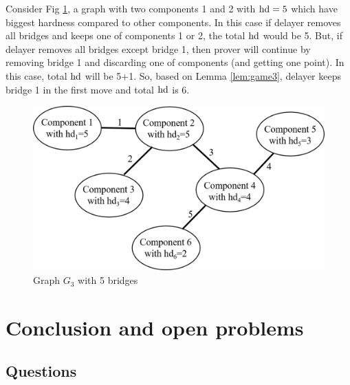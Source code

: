 \documentclass[12pt]{book}
\begin{document}
\begin{examp}\label{exp:hd6}
       Consider Fig \ref{fig:hd6}, a graph with two components 1 and 2 with $\operatorname{hd}=5$ which have biggest hardness compared
	   to other components. In this case if delayer removes all bridges and keeps one of components 1 or 2, the total $\operatorname{hd}$ 
	   would be 5. But, if delayer removes all bridges except bridge 1, then prover will continue by removing bridge 1 and discarding 
	   one of components (and getting one point). In this case, total $\operatorname{hd}$ will be 5+1. So, based on Lemma \ref{lem:game3}, 
	   delayer keeps bridge 1 in the first move and total $\operatorname{hd}$ is 6.
	  \begin{figure}
      \begin{center}
      \includegraphics[scale =0.65]{graph_with_bridges2.png}
      \caption{Graph $G_3$ with 5 bridges}
	  \label{fig:hd6}
      \end{center}
      \end{figure}
\end{examp}


\chapter{Conclusion and open problems}
\label{cha:concl}

\section{Questions}
\label{sec:Questions}
\end{document}
